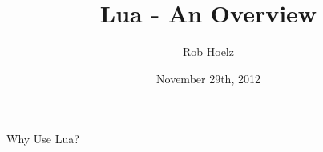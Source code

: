 \documentclass{beamer}
\title{Lua - An Overview}
\author{Rob Hoelz}
\date{November 29th, 2012}
\begin{document}

\maketitle



\begin{frame}
\begin{center}
Why Use Lua?
\end{center}
\end{frame}











\end{document}

